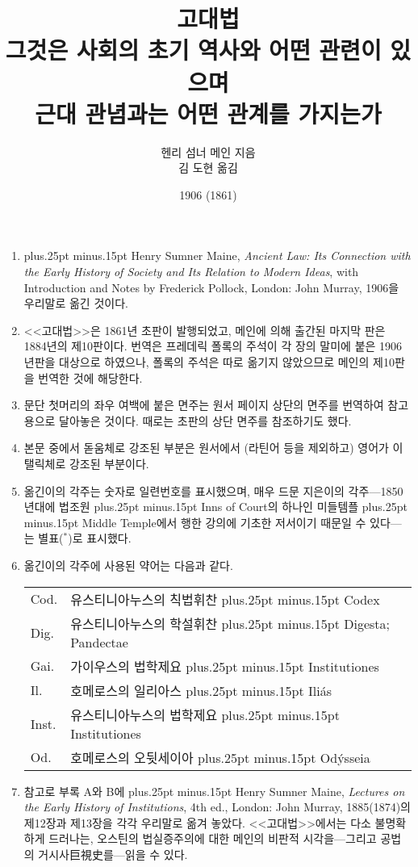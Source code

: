 \documentclass[b5paper]{book}
\def\latinmarks{\hangulpunctuations=0
    \aftergroup\hangulpunctuations\aftergroup1\aftergroup\relax }
\def\hanja#1{\begingroup\scriptsize #1\endgroup}
\def\latin#1{\ifnum\lastskip=0 \penalty50 \hskip0pt plus.25pt minus.15pt\fi
  \begingroup\latinmarks\footnotesize #1\endgroup}
\def\paren#1{\begingroup\small(#1)\endgroup}
\begin{document}
\title{고대법\\
\large 그것은 사회의 초기 역사와 어떤 관련이 있으며\\
근대 관념과는 어떤 관계를 가지는가}
\author{헨리 섬너 메인 지음\\
김 도현 옮김}
\date{1906 (1861)}

\frontmatter

\maketitle

\null\vfill
\thispagestyle{empty}
\begin{enumerate}
    \small
  \item \latin{\small
    Henry Sumner Maine, \textit{Ancient Law: Its Connection with
    the Early History of Society and Its Relation to Modern Ideas}, with
    Introduction and Notes by Frederick Pollock, London: John Murray,
    1906}을 우리말로 옮긴 것이다.
  \item <<고대법>>은 1861년 초판이 발행되었고,
    메인에 의해 출간된 마지막 판은 1884년의 제10판이다.
    번역은 프레데릭 폴록의 주석이
    각 장의 말미에 붙은 1906년판을 대상으로 하였으나,
    폴록의 주석은 따로 옮기지 않았으므로
    메인의 제10판을 번역한 것에 해당한다.
  \item 문단 첫머리의 좌우 여백에 붙은 면주는 원서 페이지 상단의 면주를
    번역하여
    참고용으로
    달아놓은 것이다.
    때로는 초판의 상단 면주를 참조하기도 했다.
  \item 본문 중에서 돋움체로 강조된 부분은
    원서에서 \paren{라틴어 등을 제외하고} 영어가
    이탤릭체로 강조된 부분이다.
  \item 옮긴이의 각주는 숫자로 일련번호를 표시했으며,
    매우 드문 지은이의 각주---1850년대에 법조원\latin{Inns of Court}의
    하나인 미들템플\latin{Middle Temple}에서
    행한 강의에 기초한 저서이기 때문일 수 있다---는
    별표($^*$)로 표시했다.
  \item 옮긴이의 각주에 사용된 약어는 다음과 같다.

    \begin{tabular}{l@{ $=$ }l}
      Cod.  & 유스티니아누스의 칙법휘찬\latin{Codex} \\
      Dig.  & 유스티니아누스의 학설휘찬\latin{Digesta; Pandectae} \\
      Gai.  & 가이우스의 법학제요\latin{Institutiones} \\
      Il.   & 호메로스의 일리아스\latin{Iliás} \\
      Inst. & 유스티니아누스의 법학제요\latin{Institutiones} \\
      Od.   & 호메로스의 오뒷세이아\latin{Odýsseia} \\
    \end{tabular}
  \item 참고로
    부록 A와 B에 \latin{Henry Sumner Maine,
    \textit{Lectures on the Early History of Institutions}, 4th ed.,
    London: John Murray, 1885(1874)}의 제12장과 제13장을 각각 우리말로
    옮겨 놓았다. <<고대법>>에서는 다소 불명확하게 드러나는,
    오스틴의 법실증주의에 대한 메인의 비판적 시각을---그리고
    공법의 거시사\hanja{巨視史}를---읽을 수 있다.
\end{enumerate}
\end{document}
